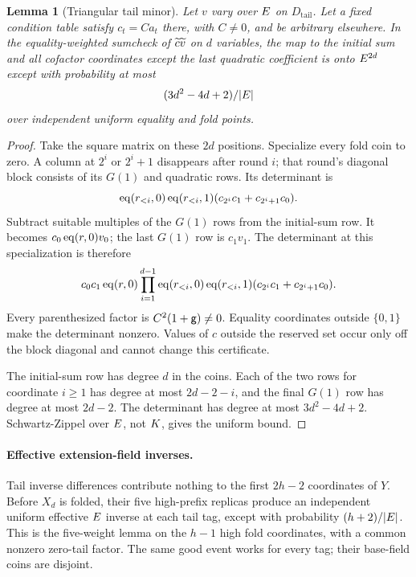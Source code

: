 \documentclass[11pt]{article}
\newtheorem{lemma}{Lemma}
\begin{document}
\begin{lemma}[Triangular tail minor]\label{lem:jump-tail}
Let $v$ vary over $E$ on $D_{\mathrm{tail}}$. Let a fixed condition table satisfy $c_t=C a_t$ there, with $C\ne0$, and be arbitrary elsewhere. In the equality-weighted sumcheck of $\widetilde{c}\widetilde{v}$ on $d$ variables, the map to the initial sum and all cofactor coordinates except the last quadratic coefficient is onto $E^{2d}$ except with probability at most
\[
 (3d^2-4d+2)/|E|
\]
over independent uniform equality and fold points.
\end{lemma}
\begin{proof}
Take the square matrix on these $2d$ positions. Specialize every fold coin to zero. A column at $2^i$ or $2^i+1$ disappears after round $i$; that round's diagonal block consists of its $G(1)$ and quadratic rows. Its determinant is
\[
 \operatorname{eq}(r_{<i},0)\operatorname{eq}(r_{<i},1)
       (c_{2^i}c_1+c_{2^i+1}c_0).
\]
Subtract suitable multiples of the $G(1)$ rows from the initial-sum row. It becomes $c_0\operatorname{eq}(r,0)v_0$; the last $G(1)$ row is $c_1v_1$. The determinant at this specialization is therefore
\[
 c_0c_1\operatorname{eq}(r,0)\prod_{i=1}^{d-1}
 \operatorname{eq}(r_{<i},0)\operatorname{eq}(r_{<i},1)
       (c_{2^i}c_1+c_{2^i+1}c_0).
\]
Every parenthesized factor is $C^2(1+\mathsf{g})\ne0$. Equality coordinates outside $\{0,1\}$ make the determinant nonzero. Values of $c$ outside the reserved set occur only off the block diagonal and cannot change this certificate.

The initial-sum row has degree $d$ in the coins. Each of the two rows for coordinate $i\ge1$ has degree at most $2d-2-i$, and the final $G(1)$ row has degree at most $2d-2$. The determinant has degree at most $3d^2-4d+2$. Schwartz-Zippel over $E$, not $K$, gives the uniform bound.
\end{proof}

\paragraph{Effective extension-field inverses.} Tail inverse differences contribute nothing to the first $2h-2$ coordinates of $Y$. Before $X_d$ is folded, their five high-prefix replicas produce an independent uniform effective $E$ inverse at each tail tag, except with probability $(h+2)/|E|$. This is the five-weight lemma on the $h-1$ high fold coordinates, with a common nonzero zero-tail factor. The same good event works for every tag; their base-field coins are disjoint.
\end{document}
